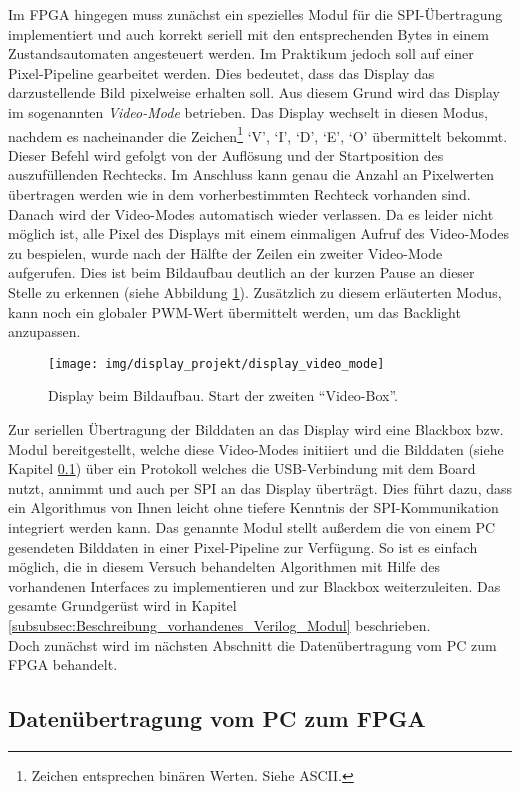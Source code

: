 Im FPGA hingegen muss zunächst ein spezielles Modul für die SPI-Übertragung implementiert und auch korrekt seriell mit den entsprechenden Bytes in einem Zustandsautomaten angesteuert werden. Im Praktikum jedoch soll auf einer Pixel-Pipeline gearbeitet werden. Dies bedeutet, dass das Display das darzustellende Bild pixelweise erhalten soll. Aus diesem Grund wird das Display im sogenannten \emph{Video-Mode} betrieben. Das Display wechselt in diesen Modus, nachdem es nacheinander die Zeichen\footnote{Zeichen entsprechen binären Werten. Siehe ASCII.} `V', `I', `D', `E', `O' übermittelt bekommt. Dieser Befehl wird gefolgt von der Auflösung und der Startposition des auszufüllenden Rechtecks. Im Anschluss kann genau die Anzahl an Pixelwerten übertragen werden wie in dem vorherbestimmten Rechteck vorhanden sind. Danach wird der Video-Modes automatisch wieder verlassen. Da es leider nicht möglich ist, alle Pixel des Displays mit einem einmaligen Aufruf des Video-Modes zu bespielen, wurde nach der Hälfte der Zeilen ein zweiter Video-Mode aufgerufen. Dies ist beim Bildaufbau deutlich an der kurzen Pause an dieser Stelle zu erkennen (siehe Abbildung \ref{fig:display_bespiel_video_mode}). Zusätzlich zu diesem erläuterten Modus, kann noch ein globaler PWM-Wert übermittelt werden, um das Backlight anzupassen.
\begin{figure}[H]
\centering
\texttt{[image: img/display\_projekt/display\_video\_mode]}
\caption{Display beim Bildaufbau. Start der zweiten ``Video-Box''.}
\label{fig:display_bespiel_video_mode}
\end{figure}
Zur seriellen Übertragung der Bilddaten an das Display wird eine Blackbox bzw. Modul bereitgestellt, welche diese Video-Modes initiiert und die Bilddaten (siehe Kapitel \ref{subsec:datenuebertragung}) über ein Protokoll welches die USB-Verbindung mit dem Board nutzt, annimmt und auch per SPI an das Display überträgt. Dies führt dazu, dass ein Algorithmus von Ihnen leicht ohne tiefere Kenntnis der SPI-Kommunikation integriert werden kann. Das genannte Modul stellt außerdem die von einem PC gesendeten Bilddaten in einer Pixel-Pipeline zur Verfügung. So ist es einfach möglich, die in diesem Versuch behandelten Algorithmen mit Hilfe des vorhandenen Interfaces zu implementieren und zur Blackbox weiterzuleiten. Das gesamte Grundgerüst wird in Kapitel \ref{subsubsec:Beschreibung_vorhandenes_Verilog_Modul} beschrieben.\\
Doch zunächst wird im nächsten Abschnitt die Datenübertragung vom PC zum FPGA behandelt.
\subsection{Datenübertragung vom PC zum FPGA}
\label{subsec:datenuebertragung}

